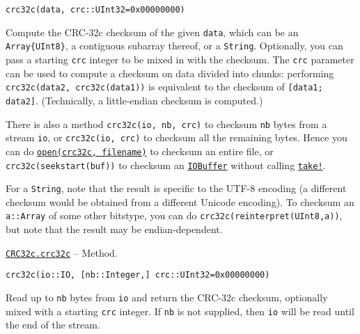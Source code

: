 \begin{adjustwidth}{2em}{0pt}


\begin{verbatim}
crc32c(data, crc::UInt32=0x00000000)
\end{verbatim}

Compute the CRC-32c checksum of the given \texttt{data}, which can be an \texttt{Array\{UInt8\}}, a contiguous subarray thereof, or a \texttt{String}.  Optionally, you can pass a starting \texttt{crc} integer to be mixed in with the checksum.  The \texttt{crc} parameter can be used to compute a checksum on data divided into chunks: performing \texttt{crc32c(data2, crc32c(data1))} is equivalent to the checksum of \texttt{[data1; data2]}. (Technically, a little-endian checksum is computed.)

There is also a method \texttt{crc32c(io, nb, crc)} to checksum \texttt{nb} bytes from a stream \texttt{io}, or \texttt{crc32c(io, crc)} to checksum all the remaining bytes. Hence you can do \hyperlink{300818094931158296}{\texttt{open(crc32c, filename)}} to checksum an entire file, or \texttt{crc32c(seekstart(buf))} to checksum an \hyperlink{15789326112236459498}{\texttt{IOBuffer}} without calling \hyperlink{4963355246106153560}{\texttt{take!}}.

For a \texttt{String}, note that the result is specific to the UTF-8 encoding (a different checksum would be obtained from a different Unicode encoding). To checksum an \texttt{a::Array} of some other bitstype, you can do \texttt{crc32c(reinterpret(UInt8,a))}, but note that the result may be endian-dependent.



\end{adjustwidth}
\hypertarget{1837004968610650380}{}
\hyperlink{1837004968610650380}{\texttt{CRC32c.crc32c}}  -- {Method.}

\begin{adjustwidth}{2em}{0pt}


\begin{verbatim}
crc32c(io::IO, [nb::Integer,] crc::UInt32=0x00000000)
\end{verbatim}

Read up to \texttt{nb} bytes from \texttt{io} and return the CRC-32c checksum, optionally mixed with a starting \texttt{crc} integer.  If \texttt{nb} is not supplied, then \texttt{io} will be read until the end of the stream.



\end{adjustwidth}

